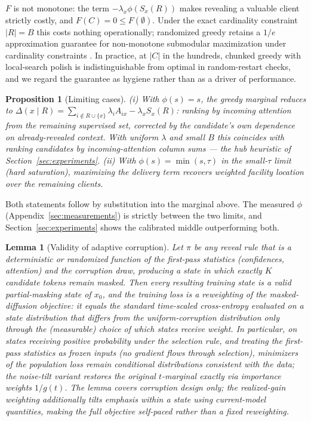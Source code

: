 \documentclass{article} %
\newtheorem{proposition}{Proposition}
\newtheorem{lemma}{Lemma}
\begin{document}
$F$ is not monotone: the term $-\lambda_x \phi(S_x(R))$ makes revealing a valuable client strictly costly, and $F(C) = 0 \leq F(\emptyset)$. Under the exact cardinality constraint $|R| = B$ this costs nothing operationally; randomized greedy retains a $1/e$ approximation guarantee for non-monotone submodular maximization under cardinality constraints \citep{buchbinder2014submodular}. In practice, at $|C|$ in the hundreds, chunked greedy with local-search polish is indistinguishable from optimal in random-restart checks, and we regard the guarantee as hygiene rather than as a driver of performance.

\begin{proposition}[Limiting cases]
\label{prop:limits}
(i) With $\phi(s) = s$, the greedy marginal reduces to
$\Delta(x \mid R) = \sum_{i \notin R \cup \{x\}} \lambda_i A_{ix} - \lambda_x S_x(R)$:
ranking by incoming attention from the remaining supervised set, corrected by the candidate's own dependence on already-revealed context. With uniform $\lambda$ and small $B$ this coincides with ranking candidates by incoming-attention column sums --- the hub heuristic of Section~\ref{sec:experiments}. (ii) With $\phi(s) = \min(s, \tau)$ in the small-$\tau$ limit (hard saturation), maximizing the delivery term recovers weighted facility location over the remaining clients.
\end{proposition}

Both statements follow by substitution into the marginal above. The measured $\phi$ (Appendix~\ref{sec:measurements}) is strictly between the two limits, and Section~\ref{sec:experiments} shows the calibrated middle outperforming both.

\begin{lemma}[Validity of adaptive corruption]
\label{lem:valid}
Let $\pi$ be any reveal rule that is a deterministic or randomized function of the first-pass statistics (confidences, attention) and the corruption draw, producing a state in which exactly $K$ candidate tokens remain masked. Then every resulting training state is a valid partial-masking state of $x_0$, and the training loss is a reweighting of the masked-diffusion objective: it equals the standard time-scaled cross-entropy evaluated on a state distribution that differs from the uniform-corruption distribution only through the (measurable) choice of which states receive weight. In particular, on states receiving positive probability under the selection rule, and treating the first-pass statistics as frozen inputs (no gradient flows through selection), minimizers of the population loss remain conditional distributions consistent with the data; the noise-tilt variant restores the original $t$-marginal exactly via importance weights $1/g(t)$. The lemma covers corruption design only; the realized-gain weighting additionally tilts emphasis \emph{within} a state using current-model quantities, making the full objective self-paced rather than a fixed reweighting.
\end{lemma}
\end{document}
